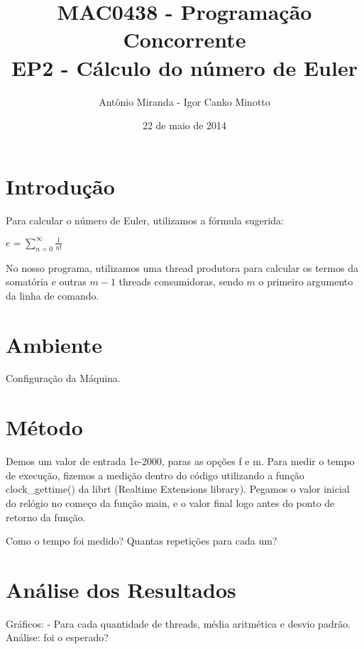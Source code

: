 \documentclass[a4paper,11pt]{article} %
\title{
	\vspace{0 mm}
	\huge{\textbf{MAC0438 - Programação Concorrente}} \\
	\vspace{3 mm}
	\huge{EP2 - Cálculo do número de Euler}
	\vspace{0 mm}
}
\author	{
	\Large{{ Antônio Miranda - Igor Canko Minotto}}	\\
}
\date{\Large{{ 22 de maio de 2014}}}
\begin{document}
\maketitle

\pagebreak 
\tableofcontents

\pagebreak
\setcounter{section}{-1}

\section{Introdução}
  Para calcular o número de Euler, utilizamos a fórmula sugerida: \linebreak 
  \centerline{ $e =\sum\limits_{n=0}^\infty \frac{1}{n!}$ } 
  No nosso programa, utilizamos uma thread produtora para calcular os termos da somatória e outras $m-1$ threads consumidoras, sendo $m$ o primeiro argumento da linha de comando. 
  
\section{Ambiente}
  Configuração da Máquina.

\section{Método}
  Demos um valor de entrada 1e-2000, paras as opções f e m. Para medir o tempo de execução,
fizemos a medição dentro do código utilizando a função clock\_gettime() da librt (Realtime Extensions library).
Pegamos o valor inicial do relógio no começo da função main, e o valor final logo antes do ponto de retorno da função.


  Como o tempo foi medido?
  Quantas repetições para cada um?

\section{Análise dos Resultados}
  Gráficos:
    - Para cada quantidade de threads, média aritmética e desvio padrão.
  Análise: foi o esperado?
\end{document}

